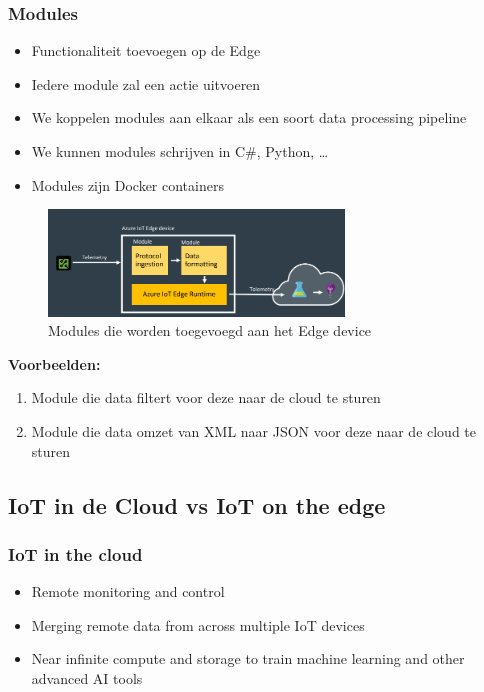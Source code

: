 \documentclass{article}
\newcommand{\bold}[1]{\textbf{#1}}
\begin{document}
\subsubsection{Modules}

\begin{itemize}
    \item Functionaliteit toevoegen op de Edge
    \item Iedere module zal een actie uitvoeren
    \item We koppelen modules aan elkaar als een soort data processing pipeline
    \item We kunnen modules schrijven in C\#, Python, \dots
    \item Modules zijn Docker containers
\end{itemize}

\begin{figure}[H]
    \centering
    \includegraphics[width=0.7\textwidth]{iot-edge4.png}
    \caption{Modules die worden toegevoegd aan het Edge device}
\end{figure}

\bold{Voorbeelden:}

\begin{enumerate}
    \item Module die data filtert voor deze naar de cloud te sturen
    \item Module die data omzet van XML naar JSON voor deze naar de cloud te sturen
\end{enumerate}

\subsection{IoT in de Cloud vs IoT on the edge}

\subsubsection{IoT in the cloud}

\begin{itemize}
    \item Remote monitoring and control
    \item Merging remote data from across multiple IoT devices
    \item Near infinite compute and storage to train machine learning and other advanced AI tools
\end{itemize}
\end{document}
